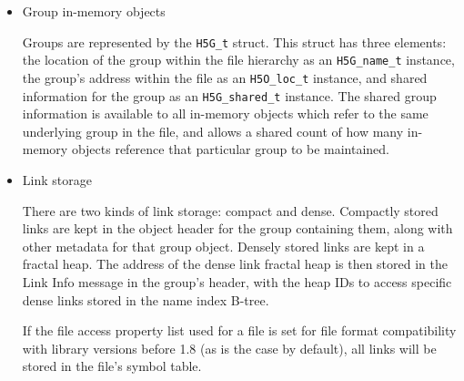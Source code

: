 \begin{itemize}

    \item Group in-memory objects

Groups are represented by the \texttt{H5G\_t} struct. This struct has three elements: the location of the group within the file hierarchy as an \texttt{H5G\_name\_t} instance, the group's address within the file as an \texttt{H5O\_loc\_t} instance, and shared information for the group as an \texttt{H5G\_shared\_t} instance. The shared group information is available to all in-memory objects which refer to the same underlying group in the file, and allows a shared count of how many in-memory objects reference that particular group to be maintained. %

    \item Link storage

There are two kinds of link storage: compact and dense. Compactly stored links are kept in the object header for the group containing them, along with other metadata for that group object. Densely stored links are kept in a fractal heap. The address of the dense link fractal heap is then stored in the Link Info message in the group's header, with the heap IDs to access specific dense links stored in the name index B-tree.

If the file access property list used for a file is set for file format compatibility with library versions before 1.8 (as is the case by default), all links will be stored in the file's symbol table.




\end{itemize}
